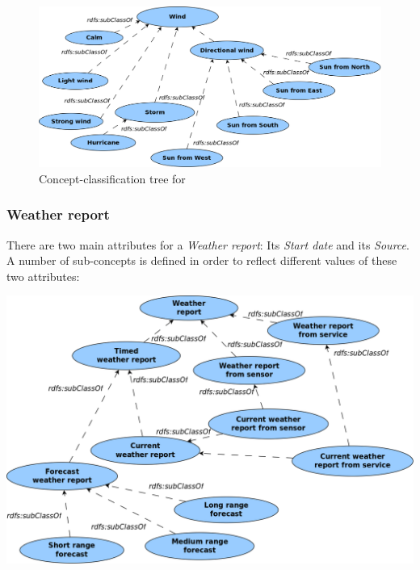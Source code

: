 \begin{figure}
  \centering
  \includegraphics[width=\textwidth]{figures/diagrams/wind.png}
  \caption{Concept-classification tree for }
  \label{fig:tree_wind}
\end{figure}






\subsubsection{Weather report}

There are two main attributes for a \emph{Weather report}: Its \emph{Start date} and its \emph{Source}. A number of sub-concepts is defined in order to reflect different values of these two attributes:

\begin{center}
  \includegraphics[width=\textwidth]{figures/diagrams/weather-report.png}
\end{center}

